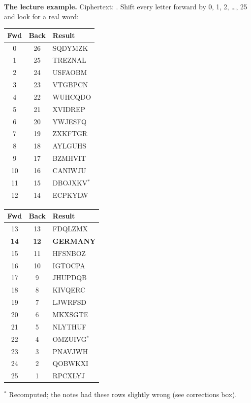 \textbf{The lecture example.} Ciphertext: . Shift every letter forward by 0, 1, 2, \dots, 25 and look for a real word:

\begin{center}\small\ttfamily\setlength{\tabcolsep}{6pt}
\begin{tabular}{@{}ccl@{}}
\toprule
\rmfamily\bfseries Fwd & \rmfamily\bfseries Back & \rmfamily\bfseries Result\\
\midrule
0 & 26 & SQDYMZK\\
1 & 25 & TREZNAL\\
2 & 24 & USFAOBM\\
3 & 23 & VTGBPCN\\
4 & 22 & WUHCQDO\\
5 & 21 & XVIDREP\\
6 & 20 & YWJESFQ\\
7 & 19 & ZXKFTGR\\
8 & 18 & AYLGUHS\\
9 & 17 & BZMHVIT\\
10 & 16 & CANIWJU\\
11 & 15 & DBOJXKV$^\ast$\\
12 & 14 & ECPKYLW\\
\bottomrule
\end{tabular}
\qquad
\begin{tabular}{@{}ccl@{}}
\toprule
\rmfamily\bfseries Fwd & \rmfamily\bfseries Back & \rmfamily\bfseries Result\\
\midrule
13 & 13 & FDQLZMX\\
\rowcolor{warn!18} \textbf{14} & \textbf{12} & \textbf{GERMANY}\\
15 & 11 & HFSNBOZ\\
16 & 10 & IGTOCPA\\
17 & 9 & JHUPDQB\\
18 & 8 & KIVQERC\\
19 & 7 & LJWRFSD\\
20 & 6 & MKXSGTE\\
21 & 5 & NLYTHUF\\
22 & 4 & OMZUIVG$^\ast$\\
23 & 3 & PNAVJWH\\
24 & 2 & QOBWKXI\\
25 & 1 & RPCXLYJ\\
\bottomrule
\end{tabular}
\end{center}
{\footnotesize $^\ast$ Recomputed; the notes had these rows slightly wrong (see corrections box).}

